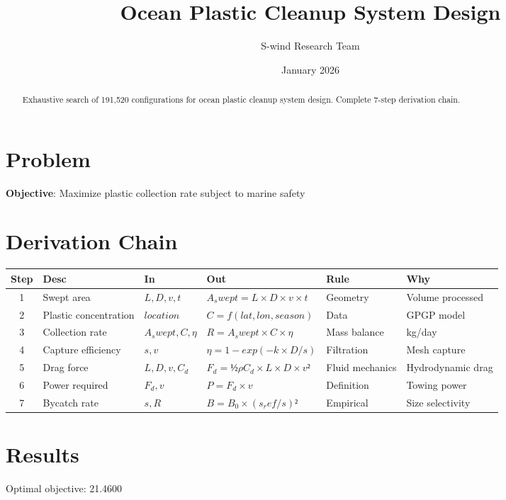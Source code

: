 \documentclass[11pt]{article}
\title{Ocean Plastic Cleanup System Design}
\author{S-wind Research Team}
\date{January 2026}
\begin{document}
\maketitle

\begin{abstract}
Exhaustive search of 191,520 configurations for ocean plastic cleanup system design. Complete 7-step derivation chain.
\end{abstract}

\section{Problem}
\textbf{Objective}: Maximize plastic collection rate subject to marine safety

\section{Derivation Chain}
\begin{longtable}{|c|p{2cm}|p{2cm}|p{3cm}|p{2cm}|p{3cm}|}
\hline
Step & Desc & In & Out & Rule & Why\\\hline\endhead
1 & Swept area & $L, D, v, t$ & $A_swept = L × D × v × t$ & Geometry & Volume processed\\\hline
2 & Plastic concentration & $location$ & $C = f(lat, lon, season)$ & Data & GPGP model\\\hline
3 & Collection rate & $A_swept, C, η$ & $R = A_swept × C × η$ & Mass balance & kg/day\\\hline
4 & Capture efficiency & $s, v$ & $η = 1 - exp(-k×D/s)$ & Filtration & Mesh capture\\\hline
5 & Drag force & $L, D, v, C_d$ & $F_d = ½ρC_d×L×D×v²$ & Fluid mechanics & Hydrodynamic drag\\\hline
6 & Power required & $F_d, v$ & $P = F_d × v$ & Definition & Towing power\\\hline
7 & Bycatch rate & $s, R$ & $B = B_0 × (s_ref/s)²$ & Empirical & Size selectivity\\\hline
\end{longtable}

\section{Results}
Optimal objective: 21.4600
\end{document}
